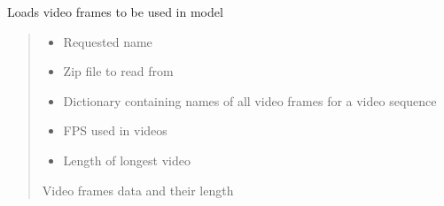 \documentclass[letterpaper,10pt,english]{sphinxmanual}
\begin{document}
\begin{fulllineitems}
\label{\detokenize{dataset:dataset.load_frames}}
\pysigstartsignatures
{}
\pysigstopsignatures
\sphinxAtStartPar
Loads video frames to be used in model
\begin{quote}\begin{description}
\begin{itemize}
\item {} 
\sphinxAtStartPar
{} \textendash{} Requested name

\item {} 
\sphinxAtStartPar
{} \textendash{} Zip file to read from

\item {} 
\sphinxAtStartPar
{} \textendash{} Dictionary containing names of all video frames for a video sequence

\item {} 
\sphinxAtStartPar
{} \textendash{} FPS used in videos

\item {} 
\sphinxAtStartPar
{} \textendash{} Length of longest video

\end{itemize}

\sphinxAtStartPar
Video frames data and their length

\end{description}\end{quote}

\end{fulllineitems}

\end{document}
